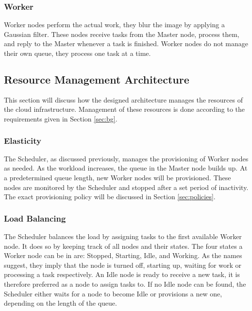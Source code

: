 \documentclass{acm_proc_article-sp}
\begin{document}
\subsubsection{Worker}
Worker nodes perform the actual work, they blur the image by applying a Gaussian filter.
These nodes receive tasks from the Master node, process them, and reply to the Master whenever a task is finished.
Worker nodes do not manage their own queue, they process one task at a time.


\subsection{Resource Management Architecture}
\label{sec:resource_man}
This section will discuss how the designed architecture manages the resources of the cloud infrastructure.
Management of these resources is done according to the requirements given in Section \ref{sec:bg}.

\subsubsection{Elasticity}
The Scheduler, as discussed previously, manages the provisioning of Worker nodes as needed.
As the workload increases, the queue in the Master node builds up.
At a predetermined queue length, new Worker nodes will be provisioned.
These nodes are monitored by the Scheduler and stopped after a set period of inactivity.
The exact provisioning policy will be discussed in Section \ref{sec:policies}.

\subsubsection{Load Balancing}
The Scheduler balances the load by assigning tasks to the first available Worker node.
It does so by keeping track of all nodes and their states.
The four states a Worker node can be in are: Stopped, Starting, Idle, and Working.
As the names suggest, they imply that the node is turned off, starting up, waiting for work or processing a task respectively.
An Idle node is ready to receive a new task, it is therefore preferred as a node to assign tasks to.
If no Idle node can be found, the Scheduler either waits for a node to become Idle or provisions a new one, depending on the length of the queue.
\end{document}
